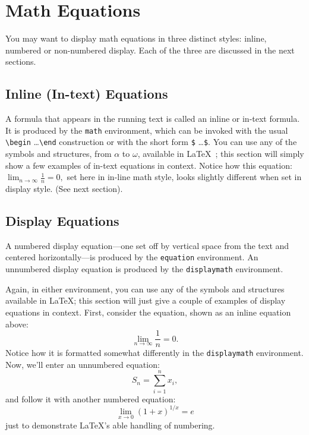 \documentclass[
]{ceurart}
\begin{document}
\section{Math Equations}

You may want to display math equations in three distinct styles:
inline, numbered or non-numbered display.  Each of the three are
discussed in the next sections.

\subsection{Inline (In-text) Equations}

A formula that appears in the running text is called an inline or
in-text formula.  It is produced by the \verb|math| environment,
which can be invoked with the usual
\verb|\begin| \ldots \verb|\end| construction or with
the short form \verb|$| \ldots \verb|$|. You can use any of the symbols
and structures, from $\alpha$ to $\omega$, available in
\LaTeX~\cite{Lamport:LaTeX};
this section will simply show a few
examples of in-text equations in context. Notice how this equation:
\begin{math}
  \lim_{n\rightarrow \infty} \frac{1}{n} = 0,
\end{math}
set here in in-line math style, looks slightly different when
set in display style.  (See next section).

\subsection{Display Equations}

A numbered display equation---one set off by vertical space from the
text and centered horizontally---is produced by the \verb|equation|
environment. An unnumbered display equation is produced by the
\verb|displaymath| environment.

Again, in either environment, you can use any of the symbols and
structures available in \LaTeX{}; this section will just give a couple
of examples of display equations in context.  First, consider the
equation, shown as an inline equation above:
\begin{equation}
  \lim_{n\rightarrow \infty} \frac{1}{n} = 0.
\end{equation}
Notice how it is formatted somewhat differently in
the \verb|displaymath|
environment.  Now, we'll enter an unnumbered equation:
\begin{displaymath}
  S_{n} = \sum_{i=1}^{n} x_{i} ,
\end{displaymath}
and follow it with another numbered equation:
\begin{equation}
  \lim_{x \to 0} (1 + x)^{1/x} = e
\end{equation}
just to demonstrate \LaTeX's able handling of numbering.
\end{document}
